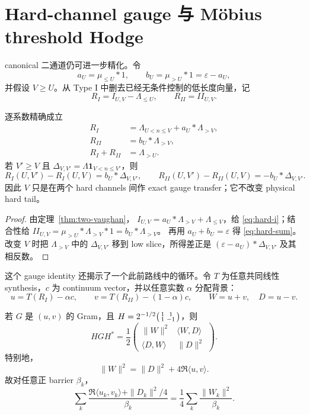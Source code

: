 \section{Hard-channel gauge 与 M\"obius threshold Hodge}

canonical 二通道仍可进一步精化。令
\[
 a_U=\mu_{\leq U}*1,\qquad
 b_U=\mu_{>U}*1=\varepsilon-a_U,
\]
并假设 $V\geq U$。从 Type I 中删去已经无条件控制的低长度向量，记
\[
 R_I=I_{U,V}-\Lambda_{\leq U},\qquad R_{II}=II_{U,V}.
\]

\begin{theorem}\label{thm:hard-gauge}
逐系数精确成立
\begin{align}
 R_I&=\Lambda_{U<n\leq V}+a_U*\Lambda_{>V},\label{eq:hard-i}\\
 R_{II}&=b_U*\Lambda_{>V},\label{eq:hard-ii}\\
 R_I+R_{II}&=\Lambda_{>U}.\label{eq:hard-sum}
\end{align}
若 $V'\geq V$ 且
$\Delta_{V,V'}=\Lambda\mathbf1_{V<n\leq V'}$，则
\[
 R_I(U,V')-R_I(U,V)=b_U*\Delta_{V,V'},\qquad
 R_{II}(U,V')-R_{II}(U,V)=-b_U*\Delta_{V,V'}.
\]
因此 $V$ 只是在两个 hard channels 间作 exact gauge transfer；它不改变
physical hard tail。
\end{theorem}

\begin{proof}
由定理~\ref{thm:two-vaughan}，
$I_{U,V}=a_U*\Lambda_{>V}+\Lambda_{\leq V}$，给
\eqref{eq:hard-i}；结合性给
$II_{U,V}=\mu_{>U}*\Lambda_{>V}*1=b_U*\Lambda_{>V}$。
再用 $a_U+b_U=\varepsilon$ 得 \eqref{eq:hard-sum}。改变 $V$ 时把
$\Lambda_{>V}$ 中的 $\Delta_{V,V'}$ 移到 low slice，所得差正是
$(\varepsilon-a_U)*\Delta_{V,V'}$ 及其相反数。
\end{proof}

这个 gauge identity 还揭示了一个此前路线中的循环。令 $T$ 为任意共同线性
synthesis，$c$ 为 continuum vector，并以任意实数 $\alpha$ 分配背景：
\[
 u=T(R_I)-\alpha c,\qquad
 v=T(R_{II})-(1-\alpha)c,\qquad
 W=u+v,\quad D=u-v.
\]

\begin{theorem}
若 $G$ 是 $(u,v)$ 的 Gram，且
$H=2^{-1/2}\begin{psmallmatrix}1&1\\1&-1\end{psmallmatrix}$，则
\[
 HGH^*=\frac12
 \begin{pmatrix}
  \|W\|^2&\langle W,D\rangle\\
  \langle D,W\rangle&\|D\|^2
 \end{pmatrix}.
\]
特别地，
\[
 \|W\|^2=\|D\|^2+4\Re\langle u,v\rangle.        \tag{HG}
\]
故对任意正 barrier $\beta_k$，
\[
 \sum_k\frac{\Re\langle u_k,v_k\rangle+\|D_k\|^2/4}{\beta_k}
 =\frac14\sum_k\frac{\|W_k\|^2}{\beta_k}.       \tag{HC}
\]
\end{theorem}

